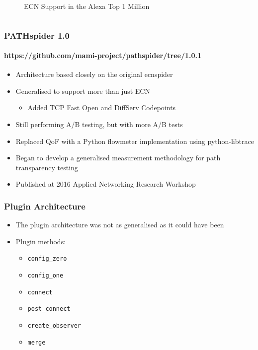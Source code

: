 \documentclass{beamer}
\begin{document}
\begin{frame}
\begin{columns}[T]
\begin{column}{.35\textwidth}
\begin{figure}
    \caption{ECN Support in the Alexa Top 1 Million}
    \end{figure}
  \end{column}
\end{columns}
\end{frame}

\begin{frame}
\frametitle{PATHspider 1.0}
\framesubtitle{https://github.com/mami-project/pathspider/tree/1.0.1}
\begin{itemize}[<+->]
\item{Architecture based closely on the original ecnspider}
\item{Generalised to support more than just ECN}
\begin{itemize}
\item{Added TCP Fast Open and DiffServ Codepoints}
\end{itemize}
\item{Still performing A/B testing, but with more A/B tests}
\item{Replaced QoF with a Python flowmeter implementation using python-libtrace}
\item{Began to develop a generalised measurement methodology for path
      transparency testing}
\item{Published at 2016 Applied Networking Research Workshop~\cite{PATHspider2016}}
\end{itemize}
\end{frame}

\begin{frame}
\frametitle{Plugin Architecture}
\begin{itemize}[<+->]
\item{The plugin architecture was not as generalised as it could have been}
\item{Plugin methods:}
\begin{itemize}
\item{\texttt{config\_zero}}
\item{\texttt{config\_one}}
\item{\texttt{connect}}
\item{\texttt{post\_connect}}
\item{\texttt{create\_observer}}
\item{\texttt{merge}}
\end{itemize}
\end{itemize}
\end{frame}
\end{document}
